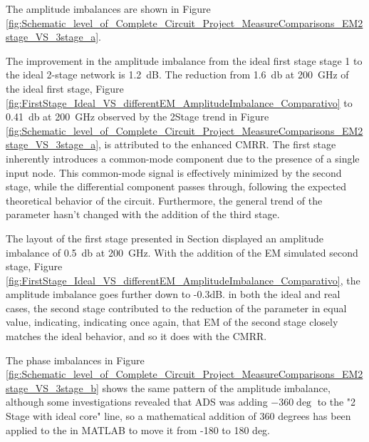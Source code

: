 The amplitude imbalances are shown in Figure \ref{fig:Schematic_level_of_Complete_Circuit_Project_MeasureComparisons_EM2stage_VS_3stage_a}.

The improvement in the amplitude imbalance from the ideal first stage stage 1 to the ideal 2-stage network is \SI{1.2}{dB}. The reduction from \SI{1.6}{\decibel} at \SI{200}{\giga\hertz} of the ideal first stage, Figure \ref{fig:FirstStage_Ideal_VS_differentEM_AmplitudeImbalance_Comparativo} to \SI{0.41}{\decibel} at \SI{200}{\giga\hertz} observed by the 2Stage trend in Figure \ref{fig:Schematic_level_of_Complete_Circuit_Project_MeasureComparisons_EM2stage_VS_3stage_a}, is attributed to the enhanced CMRR. The first stage inherently introduces a common-mode component due to the presence of a single input node. This common-mode signal is effectively minimized by the second stage, while the differential component passes through, following the expected theoretical behavior of the circuit.
Furthermore, the general trend of the parameter hasn't changed with the addition of the third stage.

The layout of the first stage presented in Section displayed an amplitude imbalance of \SI{0.5}{\decibel} at \SI{200}{\giga\hertz}. With the addition of the EM simulated second stage, Figure \ref{fig:FirstStage_Ideal_VS_differentEM_AmplitudeImbalance_Comparativo}, the amplitude imbalance goes further down to -0.3dB.
in both the ideal and real cases, the second stage contributed to the reduction of the parameter in equal value, indicating, indicating once again, that EM of the second stage closely matches the ideal behavior, and so it does with the CMRR.

The phase imbalances in Figure \ref{fig:Schematic_level_of_Complete_Circuit_Project_MeasureComparisons_EM2stage_VS_3stage_b} shows the same pattern of the amplitude imbalance, although some investigations revealed that ADS was adding $-360\deg$ to the "2 Stage with ideal core" line, so a mathematical addition of 360 degrees has been applied to the in MATLAB to move it from -180 to 180 deg.


